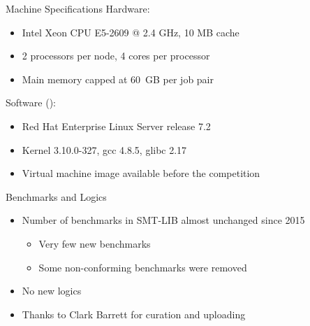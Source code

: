 \documentclass{beamer}
\begin{document}

\begin{frame}{Machine Specifications}
  Hardware:
  \begin{itemize}
  \item Intel Xeon CPU E5-2609 @ 2.4 GHz, 10 MB cache
  \item 2 processors per node, 4 cores per processor
  \item Main memory capped at 60~GB per job pair
  \end{itemize}

  \bigskip

  Software ():
  \begin{itemize}
  \item Red Hat Enterprise Linux Server release 7.2
  \item Kernel 3.10.0-327, gcc 4.8.5, glibc 2.17
  \item Virtual machine image available before the competition
  \end{itemize}
\end{frame}


\begin{frame}{Benchmarks and Logics}
  \begin{itemize}
  \item Number of benchmarks in SMT-LIB almost unchanged since 2015
    \smallskip
    \begin{itemize}
    \item Very few new benchmarks
    \item Some non-conforming benchmarks were removed
    \end{itemize}
    \medskip
  \item No new logics
    \medskip
  \item Thanks to Clark Barrett for curation and uploading
  \end{itemize}
\end{frame}

\end{document}
